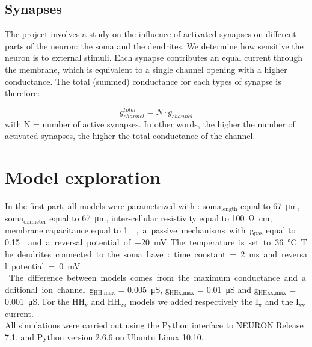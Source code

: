 \documentclass[a4paper, 10pt, conference]{ieeeconf}      %
\begin{document}
\subsection{Synapses}
The project involves a study on the influence of activated synapses on different parts of the neuron: the soma and the dendrites. We determine how sensitive the neuron is to external stimuli. Each synapse contributes an equal current through the membrane, which is equivalent to a single channel opening with a higher conductance. The total (summed) conductance for each types of synapse is therefore:

$$
g^{total}_{channel} = N \cdot g_{channel}
$$
with N = number of active synapses. In other words, the higher the number of activated synapses, the higher the total conductance of the channel.






\section{Model exploration}
In the first part, all models were parametrized with : soma$_\text{length}$ equal to \SI{67}{\micro\meter}, soma$_\text{diameter}$ equal to \SI{67}{\micro\meter}, inter-cellular resistivity equal to \SI{100}{\ohm\centi\meter}, membrane capacitance equal to \SI{1}{\micro\farad\per\centi\meter\square}, a passive mechanisms with g$_\text{pas}$ equal to \SI{0.15}{\milli\siemens\per\centi\meter\square}  and a reversal potential of \SI{-20}{\milli\volt}. The temperature is set to \SI{36}{\celsius}. The dendrites connected to the soma have : time constant = \SI{2}{\milli\second} and reversal potential = \SI{0}{\milli\volt}. \\

The difference between models comes from the maximum conductance and additional ion channel. g$_\text{HH,max}$ = \SI{0.005}{\micro\siemens}, g$_\text{HHx,max}$ = \SI{0.01}{\micro\siemens} and g$_\text{HHxx,max}$ = \SI{0.001}{\micro\siemens}. For the HH$_\text{x}$ and HH$_\text{xx}$ models we added respectively the I$_\text{x}$ and the I$_\text{xx}$ current. \\

All simulations were carried out using the Python interface to NEURON Release 7.1, and Python version 2.6.6 on Ubuntu Linux 10.10. \cite{website:neuron}\\
\end{document}

